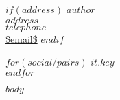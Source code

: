 \documentclass[
$if(fontsize)$
  $fontsize$,
$endif$
$if(papersize)$
  $papersize$paper,
$endif$
$for(classoption)$
  $classoption$$sep$,
$endfor$
]{scrartcl}
\begin{document}
$if(address)$
$author$\\
$address$\\
$telephone$\\
\url{$email$}
$endif$

$for(social/pairs)$
  \href{$it.value$}{$it.key$}\\
$endfor$

\begin{abstract}
\noindent
$abstract$
\end{abstract}

$body$
\end{document}
